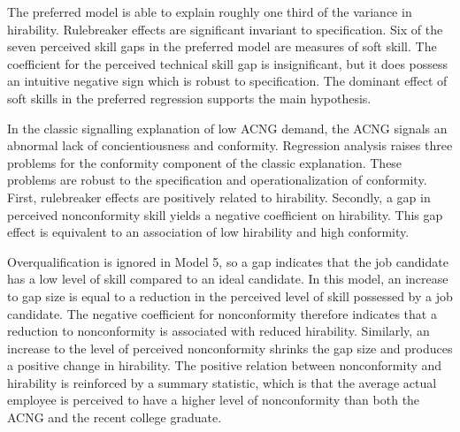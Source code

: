 \documentclass[review]{elsarticle}
\begin{document}
The preferred model is able to explain roughly one third of the variance in hirability.
Rulebreaker effects are significant invariant to specification.
Six of the seven perceived skill gaps in the preferred model are measures of soft skill.
The coefficient for the perceived technical skill gap is insignificant, but it does possess an intuitive negative sign which is robust to specification.
The dominant effect of soft skills in the preferred regression supports the main hypothesis.

In the classic signalling explanation of low ACNG demand, the ACNG signals an abnormal lack of concientiousness and conformity.
Regression analysis raises three problems for the conformity component of the classic explanation.
These problems are robust to the specification and operationalization of conformity.
First, rulebreaker effects are positively related to hirability.
Secondly, a gap in perceived nonconformity skill yields a negative coefficient on hirability.
This gap effect is equivalent to an association of low hirability and high conformity.

Overqualification is ignored in Model 5, so a gap indicates that the job candidate has a low level of skill compared to an ideal candidate.
In this model, an increase to gap size is equal to a reduction in the perceived level of skill possessed by a job candidate.
The negative coefficient for nonconformity therefore indicates that a reduction to nonconformity is associated with reduced hirability.
Similarly, an increase to the level of perceived nonconformity shrinks the gap size and produces a positive change in hirability.
The positive relation between nonconformity and hirability is reinforced by a summary statistic,
which is that the average actual employee is perceived to have a higher level of nonconformity than both the ACNG and the recent college graduate.
\end{document}
